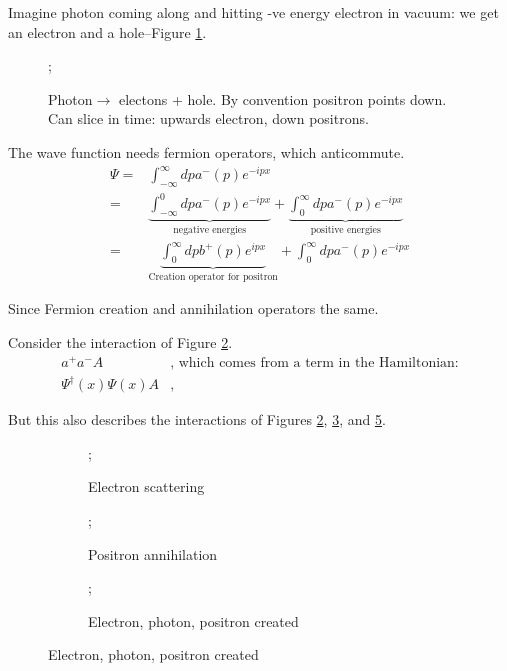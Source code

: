 \documentclass[]{article}
\begin{document}
Imagine photon coming along and hitting -ve energy electron in vacuum: we get an electron and a hole--Figure \ref{photon:dirac}.

\begin{figure}
	\begin{center}
		\caption[Photon$\rightarrow$ electrons + hole]{Photon$\rightarrow$ electons + hole. By convention positron points down. Can slice in time: upwards electron, down positrons.}\label{photon:dirac}
		;
	\end{center}
\end{figure}

The wave function needs fermion operators, which anticommute.
\begin{align*}
\Psi =& \int_{-\infty}^{\infty} dp a^-(p) e^{-ipx}\\
=& \underbrace{\int_{-\infty}^0 dp a^-(p) e^{-ipx}}_\text{negative energies}+ \underbrace{\int_0^{\infty} dp a^-(p) e^{-ipx}}_\text{positive energies}\\
=&  \underbrace{\int_0^{\infty} dp b^+(p) e^{ipx}}_\text{Creation operator for positron}+ \int_0^{\infty} dp a^-(p) e^{-ipx}
\end{align*}

Since Fermion creation and annihilation operators the same.

Consider the interaction of Figure \ref{fig:electron_scattering_dirac}.
\begin{align*}
a^+a^-A& \text{, which comes from a term in the Hamiltonian:}\\
\Psi^\dagger(x)\Psi(x)A&\text{, }
\end{align*}

But this also describes the interactions of  Figures \ref{fig:electron_scattering_dirac}, \ref{fig:positron annihilating_dirac}, and \ref{fig:all3-created}.
\begin{figure}[H]
	\caption{Possible outcomes of $\Psi^\dagger(x)\Psi(x)A$: Feynman diagrams}
	\begin{subfigure}{0.3\textwidth}
		\caption{Electron scattering}\label{fig:electron_scattering_dirac}
		;
	\end{subfigure}
	\begin{subfigure}{0.3\textwidth}
		\caption{Positron annihilation}\label{fig:positron annihilating_dirac}
		;
	\end{subfigure}
	\begin{subfigure}{0.3\textwidth}
		\caption{Electron, photon, positron created}\label{fig:all3-created}
		;
	\end{subfigure}
\end{figure}
\end{document}
